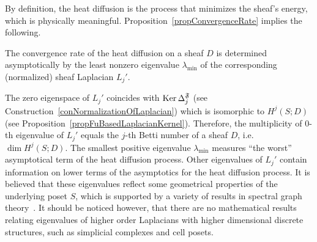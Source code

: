 By definition, the heat diffusion is the process that minimizes the sheaf's energy, which is physically meaningful. Proposition~\ref{propConvergenceRate} implies the following.

\begin{cor}\label{corSpeedOfHeatDiffusion}
The convergence rate of the heat diffusion on a sheaf $D$ is determined asymptotically by the least nonzero eigenvalue $\lambda_{\min}$ of the corresponding (normalized) sheaf Laplacian $L_j'$.
\end{cor}

\begin{rem}\label{remOtherEigenvalues}
The zero eigenspace of $L_j'$ coincides with $\operatorname{Ker}\Delta_j^{\mathfrak{F}}$ (see Construction~\ref{conNormalizationOfLaplacian}) which is isomorphic to $H^j(S;D)$ (see Proposition~\ref{propFuBasedLaplacianKernel}). Therefore, the multiplicity of $0$-th eigenvalue of $L_j'$ equals the $j$-th Betti number of a sheaf $D$, i.e. $\dim H^j(S;D)$. The smallest positive eigenvalue $\lambda_{\min}$ measures ``the worst'' asymptotical term of the heat diffusion process. Other eigenvalues of $L_j'$ contain information on lower terms of the asymptotics for the heat diffusion process. It is believed that these eigenvalues reflect some geometrical properties of the underlying poset $S$, which is supported by a variety of results in spectral graph theory~\cite{Chung}. It should be noticed however, that there are no mathematical results relating eigenvalues of higher order Laplacians with higher dimensional discrete structures, such as simplicial complexes and cell posets.
\end{rem}


